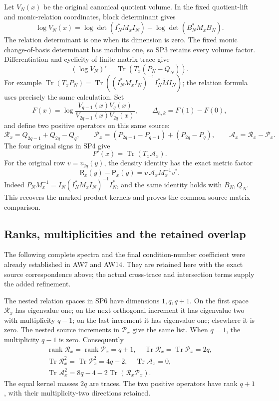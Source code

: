 Let \(V_N(x)\) be the original canonical quotient volume. In the
fixed quotient-lift and monic-relation coordinates, block determinant
gives
\[
 \log V_N(x)=\log\det(I_N^*M_xI_N)
                  -\log\det(B_N^*M_xB_N).
 \tag{SP3}
\]
The relation determinant is one when its dimension is zero.
The fixed monic change-of-basis determinant has modulus one, so
SP3 retains every volume factor. Differentiation and cyclicity of
finite matrix trace give
\[
 (\log V_N)'=\operatorname{Tr}(T_x(P_N-Q_N)).
 \tag{SP4}
\]
For example
\(\operatorname{Tr}(T_xP_N)=
\operatorname{Tr}((I_N^*M_xI_N)^{-1}I_N^*\dot M I_N)\);
the relation formula uses precisely the same calculation.
Set
\[
 F(x)=\log\frac{V_{q-1}(x)V_q(x)}
                      {V_{2q-1}(x)V_{2q}(x)},\qquad
 \Delta_{h,k}=F(1)-F(0),
 \tag{SP5}
\]
and define two positive operators on this same source:
\[
 \mathcal R_x=Q_{2q-1}+Q_{2q}-Q_q,\qquad
 \mathcal P_x=(P_{2q-1}-P_{q-1})+(P_{2q}-P_q),\qquad
 \mathcal A_x=\mathcal R_x-\mathcal P_x .
 \tag{SP6}
\]
The four original signs in SP4 give
\[
                  F'(x)=\operatorname{Tr}(T_x\mathcal A_x).
 \tag{SP7}
\]
For the original row \(v=v_{2q}(y)\), the density identity has the exact
metric factor
\[
 \mathsf R_x(y)-\mathsf P_x(y)=v\,\mathcal A_xM_x^{-1}v^* .
\]
Indeed \(P_NM_x^{-1}=I_N(I_N^*M_xI_N)^{-1}I_N^*\),
and the same identity holds with \(B_N,Q_N\). This recovers the
marked-product kernels and proves the common-source matrix comparison.

\subsection{Ranks, multiplicities and the retained overlap}
The following complete spectra and the final condition-number
coefficient were already established in AW7 and AW14. They are
retained here with the exact source correspondence above; the
actual cross-trace and intersection terms supply the added refinement.

The nested relation spaces in SP6 have dimensions \(1,q,q+1\).
On the first space \(\mathcal R_x\) has eigenvalue one; on the next
orthogonal increment it has eigenvalue two with multiplicity \(q-1\);
on the last increment it has eigenvalue one; elsewhere it is zero.
The nested source increments in \(\mathcal P_x\) give the same list.
When \(q=1\), the multiplicity \(q-1\) is zero. Consequently
\[
 \begin{gathered}
 \operatorname{rank}\mathcal R_x=\operatorname{rank}\mathcal P_x=q+1,
 \quad
 \operatorname{Tr}\mathcal R_x=\operatorname{Tr}\mathcal P_x=2q,\\
 \operatorname{Tr}\mathcal R_x^2
       =\operatorname{Tr}\mathcal P_x^2=4q-2,\quad
 \operatorname{Tr}\mathcal A_x=0,\\
 \operatorname{Tr}\mathcal A_x^2
       =8q-4-2\operatorname{Tr}(\mathcal R_x\mathcal P_x).
 \end{gathered}
 \tag{SP8}
\]
The equal kernel masses \(2q\) are traces. The two positive operators
have rank \(q+1\), with their multiplicity-two directions retained.

